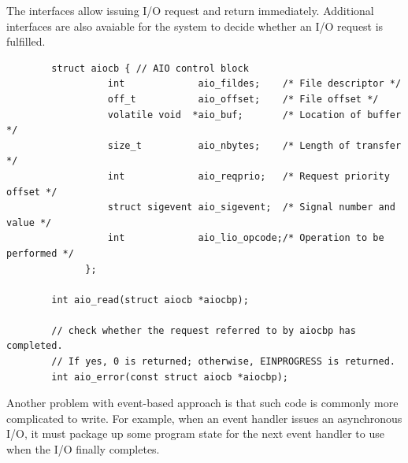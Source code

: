     The interfaces allow issuing I/O request and return immediately. Additional interfaces are also 
    avaiable for the system to decide whether an I/O request is fulfilled.

    \begin{lstlisting}
        struct aiocb { // AIO control block
                  int             aio_fildes;    /* File descriptor */
                  off_t           aio_offset;    /* File offset */
                  volatile void  *aio_buf;       /* Location of buffer */
                  size_t          aio_nbytes;    /* Length of transfer */
                  int             aio_reqprio;   /* Request priority offset */
                  struct sigevent aio_sigevent;  /* Signal number and value */
                  int             aio_lio_opcode;/* Operation to be performed */
              };

        int aio_read(struct aiocb *aiocbp);

        // check whether the request referred to by aiocbp has completed.
        // If yes, 0 is returned; otherwise, EINPROGRESS is returned.
        int aio_error(const struct aiocb *aiocbp);
    \end{lstlisting}


    Another problem with event-based approach is that such code is commonly more complicated to write.
    For example, when an event handler issues an asynchronous I/O, it must package up some 
    program state for the next event handler to use when the I/O finally completes.
    

    







